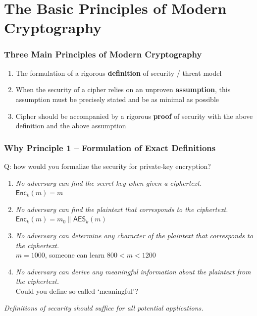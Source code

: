 \section{The Basic Principles of Modern Cryptography}
\begin{frame}\frametitle{Three Main Principles of Modern Cryptography}
\begin{enumerate}
\item The formulation of a rigorous \textbf{definition} of security / threat model
\item When the security of a cipher relies on an unproven \textbf{assumption}, this assumption must be precisely stated and be as minimal as possible
\item Cipher should be accompanied by a rigorous \textbf{proof} of security with the above definition and the above assumption
\end{enumerate}
\end{frame}
\begin{frame}\frametitle{Why Principle 1 -- Formulation of Exact Definitions}
\begin{exampleblock}{Q: how would you formalize the security for private-key encryption?}
\begin{enumerate}
\item \emph{No adversary can find the secret key when given a ciphertext.}\\
$\mathsf{Enc}_k(m)=m$
\item \emph{No adversary can find the plaintext that corresponds to the ciphertext.}\\
$\mathsf{Enc}_k(m)=m_{0}\| \mathsf{AES}_k(m)$
\item \emph{No adversary can determine any character of the plaintext that corresponds to the ciphertext.}\\
$m=1000$, someone can learn $ 800 < m < 1200$
\item \emph{No adversary can derive any meaningful information about the plaintext from the ciphertext.}\\
Could you define so-called `meaningful'?
\end{enumerate}
\emph{\alert{Definitions of security should suffice for all potential applications.}}
\end{exampleblock}
\end{frame}
